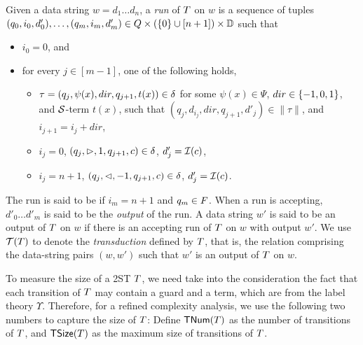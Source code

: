 Given a data string $w = d_1 \dots d_n$, a \emph{run} of $T$ on $w$
is a sequence of tuples $(q_0, i_0, d'_0), \ldots, (q_m, i_m, d'_m) \in Q \times (\{0\} \cup [n+1]) \times \mathbb{D}$ 
such that
\begin{itemize}
    \item $i_0 = 0$, and
    \item for every $j \in [m-1]$, one of the following holds,
    \begin{itemize}
  	\item  $\tau=(q_j, \psi(x), dir, q_{j+1}, t(x)) \in \delta$ for some $\psi(x) \in \Psi$, $dir \in \{-1, 0, 1\}$, and $\mathcal{S}$-term $t(x)$, such that $(q_j, d_{i_j}, dir, q_{j+1}, d'_j) \in \|\tau\|$, and $i_{j+1} = i_j + dir$,
	\item $i_j = 0$, $(q_j, \vartriangleright, 1, q_{j+1}, c) \in \delta$, $d'_j = \mathcal{I}(c)$,
	\item $i_j = n+1$, $(q_j, \vartriangleleft, -1, q_{j+1}, c) \in \delta$, $d'_j = \mathcal{I}(c)$.
  \end{itemize}
\end{itemize}
The run is said to be  if $i_m = n+1$ and $q_m \in F$. When a run is accepting, $d'_0 \ldots d'_m$ is said to be the \emph{output} of the run.
A data string $w'$ is said to be an output of $T$ on $w$ if there is an accepting run of
$T$ on $w$ with output $w'$. We use $\mathcal{T}(T)$ to denote the \emph{transduction} defined by $T$, that is, the relation comprising the data-string pairs $(w, w')$ such that $w'$ is an output of $T$ on $w$.

To measure the size of a 2ST $T$, we need take into the consideration the fact that each transition of $T$ may contain a guard and a term, which are from the label theory $\Upsilon$.
%
Therefore, for a refined complexity analysis, we use the following two numbers to capture the size of $T$:  Define $\mathsf{TNum}(T)$ as the number of transitions of $T$, and $\mathsf{TSize}(T)$ as the maximum size of transitions of $T$.


